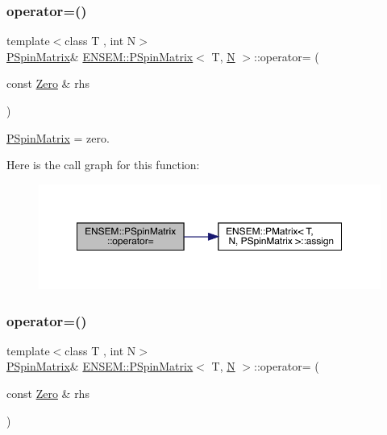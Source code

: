 \subsubsection{\texorpdfstring{operator=()}{operator=()}\hspace{0.1cm}{\footnotesize\ttfamily [1/6]}}
{\footnotesize\ttfamily template$<$class T , int N$>$ \\
\mbox{\hyperlink{classENSEM_1_1PSpinMatrix}{P\+Spin\+Matrix}}\& \mbox{\hyperlink{classENSEM_1_1PSpinMatrix}{E\+N\+S\+E\+M\+::\+P\+Spin\+Matrix}}$<$ T, \mbox{\hyperlink{operator__name__util_8cc_a7722c8ecbb62d99aee7ce68b1752f337}{N}} $>$\+::operator= (\begin{DoxyParamCaption}\item[{const \mbox{\hyperlink{structENSEM_1_1Zero}{Zero}} \&}]{rhs }\end{DoxyParamCaption})\hspace{0.3cm}{\ttfamily [inline]}}



\mbox{\hyperlink{classENSEM_1_1PSpinMatrix}{P\+Spin\+Matrix}} = zero. 

Here is the call graph for this function\+:
\nopagebreak
\begin{figure}[H]
\begin{center}
\leavevmode
\includegraphics[width=350pt]{d0/d1e/classENSEM_1_1PSpinMatrix_a2a776d9189f8d6fa8f9d9bc6758713c9_cgraph}
\end{center}
\end{figure}
\mbox{\label{classENSEM_1_1PSpinMatrix_a2a776d9189f8d6fa8f9d9bc6758713c9}} 
\subsubsection{\texorpdfstring{operator=()}{operator=()}\hspace{0.1cm}{\footnotesize\ttfamily [2/6]}}
{\footnotesize\ttfamily template$<$class T , int N$>$ \\
\mbox{\hyperlink{classENSEM_1_1PSpinMatrix}{P\+Spin\+Matrix}}\& \mbox{\hyperlink{classENSEM_1_1PSpinMatrix}{E\+N\+S\+E\+M\+::\+P\+Spin\+Matrix}}$<$ T, \mbox{\hyperlink{operator__name__util_8cc_a7722c8ecbb62d99aee7ce68b1752f337}{N}} $>$\+::operator= (\begin{DoxyParamCaption}\item[{const \mbox{\hyperlink{structENSEM_1_1Zero}{Zero}} \&}]{rhs }\end{DoxyParamCaption})\hspace{0.3cm}{\ttfamily [inline]}}



